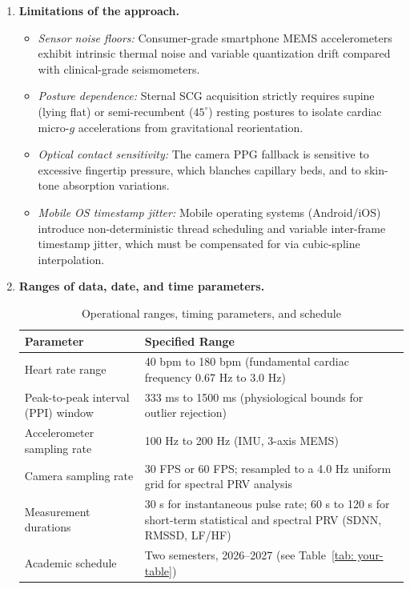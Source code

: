 \begin{enumerate}
	\item \textbf{Limitations of the approach.}
	\begin{itemize}
		\item \textit{Sensor noise floors:} Consumer-grade smartphone MEMS
		accelerometers exhibit intrinsic thermal noise and variable
		quantization drift compared with clinical-grade seismometers.
		\item \textit{Posture dependence:} Sternal SCG acquisition strictly
		requires supine (lying flat) or semi-recumbent ($45^{\circ}$)
		resting postures to isolate cardiac micro-$g$ accelerations from
		gravitational reorientation.
		\item \textit{Optical contact sensitivity:} The camera PPG fallback is
		sensitive to excessive fingertip pressure, which blanches
		capillary beds, and to skin-tone absorption variations.
		\item \textit{Mobile OS timestamp jitter:} Mobile operating systems
		(Android/iOS) introduce non-deterministic thread scheduling and
		variable inter-frame timestamp jitter, which must be compensated
		for via cubic-spline interpolation.
	\end{itemize}
	
	\item \textbf{Ranges of data, date, and time parameters.}
	\begin{table}[!ht]
		\footnotesize
		\centering
		\caption{Operational ranges, timing parameters, and schedule}
		\label{tab:ranges}
		\begin{tabular}{|p{4.0cm}|p{9.0cm}|}
			\hline
			\textbf{Parameter} & \textbf{Specified Range} \\ \hline
			Heart rate range & 40 bpm to 180 bpm (fundamental cardiac frequency
			0.67 Hz to 3.0 Hz) \\ \hline
			Peak-to-peak interval (PPI) window & 333 ms to 1500 ms
			(physiological bounds for outlier rejection) \\ \hline
			Accelerometer sampling rate & 100 Hz to 200 Hz (IMU, 3-axis MEMS) \\ \hline
			Camera sampling rate & 30 FPS or 60 FPS; resampled to a 4.0 Hz uniform
			grid for spectral PRV analysis \\ \hline
			Measurement durations & 30 s for instantaneous pulse rate; 60 s to
			120 s for short-term statistical and spectral PRV (SDNN, RMSSD,
			LF/HF) \\ \hline
			Academic schedule & Two semesters, 2026--2027
			(see Table~\ref{tab: your-table}) \\ \hline
		\end{tabular}
	\end{table}
	

\end{enumerate}
